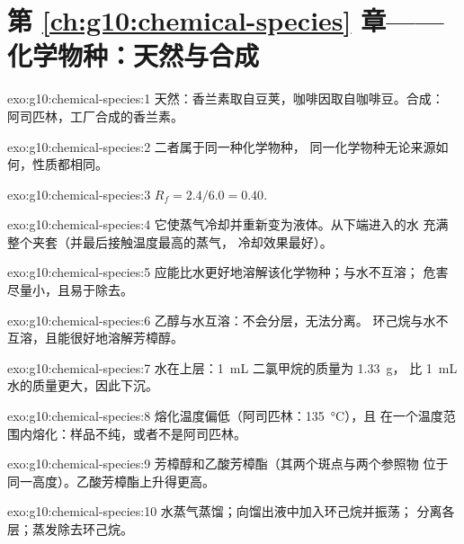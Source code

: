 \section*{第 \ref{ch:g10:chemical-species} 章——化学物种：天然与合成}

\begin{solution}{exo:g10:chemical-species:1}
天然：香兰素取自豆荚，咖啡因取自咖啡豆。合成：
阿司匹林，工厂合成的香兰素。
\end{solution}

\begin{solution}{exo:g10:chemical-species:2}
二者属于同一种化学物种，
同一化学物种无论来源如何，性质都相同。
\end{solution}

\begin{solution}{exo:g10:chemical-species:3}
$R_f = 2.4/6.0 = 0.40$.
\end{solution}

\begin{solution}{exo:g10:chemical-species:4}
它使蒸气冷却并重新变为液体。从下端进入的水
充满整个夹套（并最后接触温度最高的蒸气，
冷却效果最好）。
\end{solution}

\begin{solution}{exo:g10:chemical-species:5}
应能比水更好地溶解该化学物种；与水不互溶；
危害尽量小，且易于除去。
\end{solution}

\begin{solution}{exo:g10:chemical-species:6}
乙醇与水互溶：不会分层，无法分离。
环己烷与水不互溶，且能很好地溶解芳樟醇。
\end{solution}

\begin{solution}{exo:g10:chemical-species:7}
水在上层：\qty{1}{mL} 二氯甲烷的质量为 \qty{1.33}{g}，
比 \qty{1}{mL} 水的质量更大，因此下沉。
\end{solution}

\begin{solution}{exo:g10:chemical-species:8}
熔化温度偏低（阿司匹林：\qty{135}{\celsius}），且
在一个温度范围内熔化：样品不纯，或者不是阿司匹林。
\end{solution}

\begin{solution}{exo:g10:chemical-species:9}
芳樟醇和乙酸芳樟酯（其两个斑点与两个参照物
位于同一高度）。乙酸芳樟酯上升得更高。
\end{solution}

\begin{solution}{exo:g10:chemical-species:10}
水蒸气蒸馏；向馏出液中加入环己烷并振荡；
分离各层；蒸发除去环己烷。
\end{solution}

